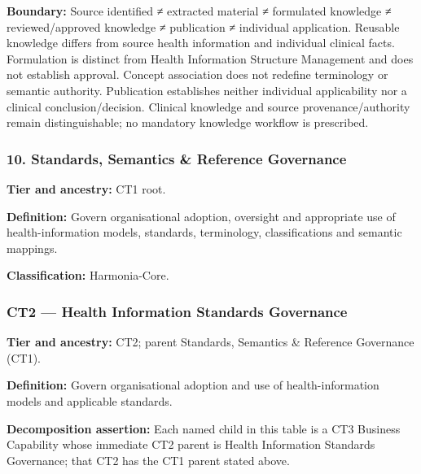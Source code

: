 \textbf{Boundary:} Source identified ≠ extracted material ≠ formulated knowledge ≠ reviewed/\allowbreak{}approved knowledge ≠ publication ≠ individual application. Reusable knowledge differs from source health information and individual clinical facts. Formulation is distinct from Health Information Structure Management and does not establish approval. Concept association does not redefine terminology or semantic authority. Publication establishes neither individual applicability nor a clinical conclusion/\allowbreak{}decision. Clinical knowledge and source provenance/\allowbreak{}authority remain distinguishable; no mandatory knowledge workflow is prescribed.

\label{rad:business:683}
\subsubsection*{10. Standards, Semantics \& Reference Governance}
\label{rad:business:685}

\textbf{Tier and ancestry:} CT1 root.

\label{rad:business:687}

\textbf{Definition:} Govern organisational adoption, oversight and appropriate use of health-information models, standards, terminology, classifications and semantic mappings.

\label{rad:business:689}

\textbf{Classification:} Harmonia-Core.

\label{rad:business:691}
\subsubsection*{CT2 — Health Information Standards Governance}
\label{rad:business:693}

\textbf{Tier and ancestry:} CT2; parent Standards, Semantics \& Reference Governance (CT1).

\label{rad:business:695}

\textbf{Definition:} Govern organisational adoption and use of health-information models and applicable standards.

\label{rad:business:697}

\textbf{Decomposition assertion:} Each named child in this table is a CT3 Business Capability whose immediate CT2 parent is Health Information Standards Governance; that CT2 has the CT1 parent stated above.

